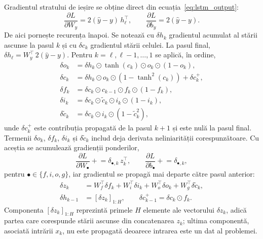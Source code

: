 Gradientul stratului de ieșire se obține direct din
ecuația~\eqref{eq:lstm_output}:
\begin{equation}
\frac{\partial L}{\partial W_y} = 2(\hat{y}-y)\, h_{\ell}^{\top},
\qquad
\frac{\partial L}{\partial b_y} = 2(\hat{y}-y).
\end{equation}
De aici pornește recurența înapoi. Se notează cu $\delta h_k$ gradientul
acumulat al stării ascunse la pasul $k$ și cu $\delta c_k$ gradientul stării
celulei. La pasul final, $\delta h_{\ell} = W_y^{\top}\, 2(\hat{y}-y)$. Pentru
$k = \ell, \ell-1, \ldots, 1$ se aplică, în ordine,
\begin{align}
\delta o_k &= \delta h_k \odot \tanh(c_k) \odot o_k \odot (1 - o_k), \\
\delta c_k &= \delta h_k \odot o_k \odot \!\left(1 - \tanh^2(c_k)\right) + \delta c_k^{+}, \\
\delta f_k &= \delta c_k \odot c_{k-1} \odot f_k \odot (1 - f_k), \\
\delta i_k &= \delta c_k \odot \tilde{c}_k \odot i_k \odot (1 - i_k), \\
\delta \tilde{c}_k &= \delta c_k \odot i_k \odot \!\left(1 - \tilde{c}_k^2\right),
\end{align}
unde $\delta c_k^{+}$ este contribuția propagată de la pasul $k+1$ și este nulă
la pasul final. Termenii $\delta o_k$, $\delta f_k$, $\delta i_k$ și
$\delta\tilde{c}_k$ includ deja derivata neliniarității corespunzătoare. Cu
aceștia se acumulează gradienții ponderilor,
\begin{equation}
\frac{\partial L}{\partial W_{\bullet}} \mathrel{+}= \delta_{\bullet,k}\, z_k^{\top},
\qquad
\frac{\partial L}{\partial b_{\bullet}} \mathrel{+}= \delta_{\bullet,k},
\end{equation}
pentru $\bullet \in \{f, i, o, g\}$, iar gradientul se propagă mai departe către
pasul anterior:
\begin{align}
\delta z_k &= W_f^{\top}\delta f_k + W_i^{\top}\delta i_k
            + W_o^{\top}\delta o_k + W_g^{\top}\delta \tilde{c}_k, \\
\delta h_{k-1} &= \left[\delta z_k\right]_{1:H},
\qquad
\delta c_{k-1}^{+} = \delta c_k \odot f_k.
\end{align}
Componenta $\left[\delta z_k\right]_{1:H}$ reprezintă primele $H$ elemente ale
vectorului $\delta z_k$, adică partea care corespunde stării ascunse din
concatenarea $z_k$; ultima componentă, asociată intrării $x_k$, nu este
propagată deoarece intrarea este un dat al problemei.

